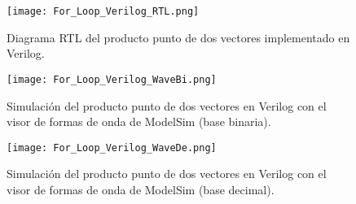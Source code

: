 \begin{figure}[ht]
	\centering
	\texttt{[image: For\_Loop\_Verilog\_RTL.png]}
	\caption{Diagrama RTL del producto punto de dos vectores implementado en Verilog. \label{fig:for_loop_verilog_rtl}}
\end{figure}

\begin{figure}[ht]
	\centering
	\texttt{[image: For\_Loop\_Verilog\_WaveBi.png]}
	\caption{Simulación del producto punto de dos vectores en Verilog con el visor de formas de onda de ModelSim (base binaria). \label{fig:for_loop_verilog_wavebi}}
\end{figure}

\begin{figure}[ht]
	\centering
	\texttt{[image: For\_Loop\_Verilog\_WaveDe.png]}
	\caption{Simulación del producto punto de dos vectores en Verilog con el visor de formas de onda de ModelSim (base decimal). \label{fig:for_loop_verilog_wavede}}
\end{figure}